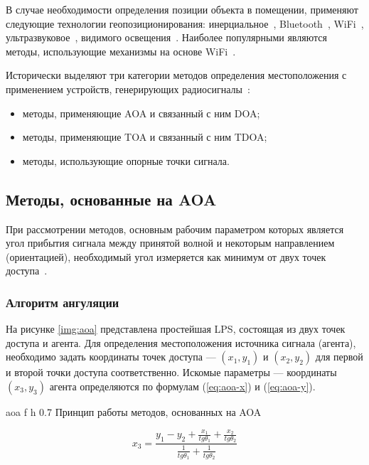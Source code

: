 В случае необходимости определения позиции объекта в помещении, применяют следующие технологии геопозиционирования: инерциальное~\cite{inertial}, Bluetooth~\cite{bluetooth}, WiFi~\cite{wifi}, ультразвуковое~\cite{ultrasound}, видимого освещения~\cite{light}. Наиболее популярными являются методы, использующие механизмы на основе WiFi~\cite{trends}.

Исторически выделяют три категории методов определения местоположения с применением устройств, генерирующих радиосигналы~\cite{wlan}:

\begin{itemize}[label=---]
    \item методы, применяющие AOA и связанный с ним DOA;
    \item методы, применяющие TOA и связанный с ним TDOA;
    \item методы, использующие опорные точки сигнала.
\end{itemize}

\subsection{Методы, основанные на AOA}

При рассмотрении методов, основным рабочим параметром которых является угол прибытия сигнала между принятой волной и некоторым направлением (ориентацией), необходимый угол измеряется как минимум от двух точек доступа~\cite{aoa}. 

\subsubsection{Алгоритм ангуляции}

На рисунке \ref{img:aoa} представлена простейшая LPS, состоящая из двух точек доступа и агента. Для определения местоположения источника сигнала (агента), необходимо задать координаты точек доступа --- $(x_1, y_1)$ и $(x_2, y_2)$ для первой и второй точки доступа соответственно. Искомые параметры --- координаты $(x_3, y_3)$ агента определяются по формулам (\ref{eq:aoa-x}) и (\ref{eq:aoa-y}).

    {aoa}
    {f}
    {h}
    {0.7\linewidth}
    {Принцип работы методов, основанных на AOA}

\begin{equation}
    x_3 = \frac{y_1 - y_2 + \frac{x_1}{tg\theta_1} + \frac{x_2}{tg\theta_2}}{\frac{1}{tg\theta_1} + \frac{1}{tg\theta_2}}
    \label{eq:aoa-x}
\end{equation}

